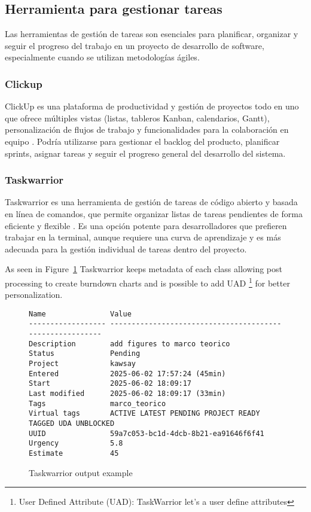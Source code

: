 \subsection{Herramienta para gestionar tareas}
Las herramientas de gestión de tareas son esenciales para planificar, organizar y seguir el progreso del trabajo en un proyecto de desarrollo de software, especialmente cuando se utilizan metodologías ágiles.

\subsubsection{Clickup}
ClickUp es una plataforma de productividad y gestión de proyectos todo en uno que ofrece múltiples vistas (listas, tableros Kanban, calendarios, Gantt), personalización de flujos de trabajo y funcionalidades para la colaboración en equipo \parencite{ClickUp}.
Podría utilizarse para gestionar el backlog del producto, planificar sprints, asignar tareas y seguir el progreso general del desarrollo del sistema.

\subsubsection{Taskwarrior}
Taskwarrior es una herramienta de gestión de tareas de código abierto y basada en línea de comandos, que permite organizar listas de tareas pendientes de forma eficiente y flexible \parencite{Taskwarrior}.
Es una opción potente para desarrolladores que prefieren trabajar en la terminal, aunque requiere una curva de aprendizaje y es más adecuada para la gestión individual de tareas dentro del proyecto.

As seen in Figure~\ref{fig:taskWarriorTaskOutput} Taskwarrior keeps metadata of each class allowing post processing to create burndown charts and is possible to add UAD \footnote{User Defined Attribute (UAD): TaskWarrior let's a user define attributes} for better personalization.

\begin{figure}
	\caption{Taskwarrior output example}\label{fig:taskWarriorTaskOutput}
	\begin{verbatim}
Name               Value
------------------ ---------------------------------------------------------
Description        add figures to marco teorico
Status             Pending
Project            kawsay
Entered            2025-06-02 17:57:24 (45min)
Start              2025-06-02 18:09:17
Last modified      2025-06-02 18:09:17 (33min)
Tags               marco_teorico
Virtual tags       ACTIVE LATEST PENDING PROJECT READY TAGGED UDA UNBLOCKED
UUID               59a7c053-bc1d-4dcb-8b21-ea91646f6f41
Urgency            5.8
Estimate           45
	\end{verbatim}
\end{figure}

